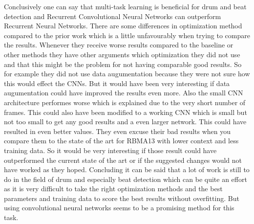\documentclass[11pt,twocolumn]{article}
\begin{document}
Conclusively one can say that multi-task learning is beneficial for drum and beat detection and Recurrent Convolutional Neural Networks can outperform Recurrent Neural Networks.\newline
There are some differences in optimization method compared to the prior work which is a little unfavourably when trying to compare the results. Whenever they receive worse results compared to the baseline or other methods they have other arguments which optimization they did not use and that this might be the problem for not having comparable good results. So for example they did not use data augumentation because they were not sure how this would effect the CNNs. But it would have been very interesting if data augumentation could have improved the results even more.\newline
Also the small CNN architecture performes worse which is explained due to the very short number of frames. This could also have been modified to a working CNN which is small but not too small to get any good results and a even larger network. This could have resulted in even better values. They even excuse their bad results when you compare them to the state of the art for RBMA13 with lower context and less training data. So it would be very interesting if those result could have outperformed the current state of the art or if the suggested changes would not have worked as they hoped.\newline
Concluding it can be said that a lot of work is still to do in the field of drum and especially beat detection which can be quite an effort as it is very difficult to take the right optimization methods and the best parameters and training data to score the best results without overfitting. But using convolutional neural networks seems to be a promising method for this task.
\end{document}
